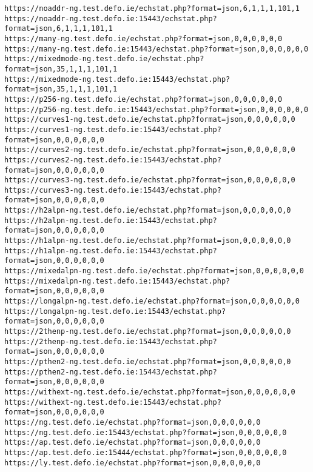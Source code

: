 \begin{verbatim}
https://noaddr-ng.test.defo.ie/echstat.php?format=json,6,1,1,1,101,1
https://noaddr-ng.test.defo.ie:15443/echstat.php?format=json,6,1,1,1,101,1
https://many-ng.test.defo.ie/echstat.php?format=json,0,0,0,0,0,0
https://many-ng.test.defo.ie:15443/echstat.php?format=json,0,0,0,0,0,0
https://mixedmode-ng.test.defo.ie/echstat.php?format=json,35,1,1,1,101,1
https://mixedmode-ng.test.defo.ie:15443/echstat.php?format=json,35,1,1,1,101,1
https://p256-ng.test.defo.ie/echstat.php?format=json,0,0,0,0,0,0
https://p256-ng.test.defo.ie:15443/echstat.php?format=json,0,0,0,0,0,0
https://curves1-ng.test.defo.ie/echstat.php?format=json,0,0,0,0,0,0
https://curves1-ng.test.defo.ie:15443/echstat.php?format=json,0,0,0,0,0,0
https://curves2-ng.test.defo.ie/echstat.php?format=json,0,0,0,0,0,0
https://curves2-ng.test.defo.ie:15443/echstat.php?format=json,0,0,0,0,0,0
https://curves3-ng.test.defo.ie/echstat.php?format=json,0,0,0,0,0,0
https://curves3-ng.test.defo.ie:15443/echstat.php?format=json,0,0,0,0,0,0
https://h2alpn-ng.test.defo.ie/echstat.php?format=json,0,0,0,0,0,0
https://h2alpn-ng.test.defo.ie:15443/echstat.php?format=json,0,0,0,0,0,0
https://h1alpn-ng.test.defo.ie/echstat.php?format=json,0,0,0,0,0,0
https://h1alpn-ng.test.defo.ie:15443/echstat.php?format=json,0,0,0,0,0,0
https://mixedalpn-ng.test.defo.ie/echstat.php?format=json,0,0,0,0,0,0
https://mixedalpn-ng.test.defo.ie:15443/echstat.php?format=json,0,0,0,0,0,0
https://longalpn-ng.test.defo.ie/echstat.php?format=json,0,0,0,0,0,0
https://longalpn-ng.test.defo.ie:15443/echstat.php?format=json,0,0,0,0,0,0
https://2thenp-ng.test.defo.ie/echstat.php?format=json,0,0,0,0,0,0
https://2thenp-ng.test.defo.ie:15443/echstat.php?format=json,0,0,0,0,0,0
https://pthen2-ng.test.defo.ie/echstat.php?format=json,0,0,0,0,0,0
https://pthen2-ng.test.defo.ie:15443/echstat.php?format=json,0,0,0,0,0,0
https://withext-ng.test.defo.ie/echstat.php?format=json,0,0,0,0,0,0
https://withext-ng.test.defo.ie:15443/echstat.php?format=json,0,0,0,0,0,0
https://ng.test.defo.ie/echstat.php?format=json,0,0,0,0,0,0
https://ng.test.defo.ie:15443/echstat.php?format=json,0,0,0,0,0,0
https://ap.test.defo.ie/echstat.php?format=json,0,0,0,0,0,0
https://ap.test.defo.ie:15444/echstat.php?format=json,0,0,0,0,0,0
https://ly.test.defo.ie/echstat.php?format=json,0,0,0,0,0,0
\end{verbatim}
\normalsize

